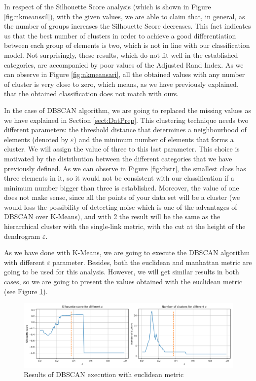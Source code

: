 In respect of the Silhouette Score analysis (which is shown in Figure \ref{fig:nkmeanssil}), with the given values, we are able to claim that, in general, as the number of groups increases the Silhouette Score decreases. This fact indicates us that the best number of clusters in order to achieve a good differentiation between each group of elements is two, which is not in line with our classification model. Not surprisingly, these results, which do not fit well in the established categories, are accompanied by poor values of the Adjusted Rand Index. As we can observe in Figure \ref{fig:nkmeansari}, all the obtained values with any number of cluster is very close to zero, which means, as we have previously explained, that the obtained classification does not match with ours.

In the case of DBSCAN algorithm, we are going to replaced the missing values as we have explained in Section \ref{sect:DatPrep}. This clustering technique needs two different parameters: the threshold distance that determines a neighbourhood of elements (denoted by $\varepsilon$) and the minimum number of elements that forms a cluster. We will assign the value of three to this last parameter. This choice is motivated by the distribution between the different categories that we have previously defined. As we can observe in Figure \ref{fig:distr}, the smallest class has three elements in it, so it would not be consistent with our classification if a minimum number bigger than three is established. Moreover, the value of one does not make sense, since all the points of your data set will be a cluster (we would loss the possibility of detecting noise which is one of the advantages of DBSCAN over K-Means), and with 2 the result will be the same as the hierarchical cluster \citep{nielsen2016hierarchical} with the single-link metric, with the cut at the height of the dendrogram $\varepsilon$.

As we have done with K-Means, we are going to execute the DBSCAN algorithm with different $\varepsilon$ parameter. Besides, both the euclidean and manhattan metric are going to be used for this analysis. However, we will get similar results in both cases, so we are going to present the values obtained with the euclidean metric (see Figure \ref{fig:dbscaneu}).

\begin{figure}[t]
	\centering%
	\centerline{\includegraphics[width=\textwidth]{Imagenes/Bitmap/Clustering/dbscansil.png}}%
	\caption{Results of DBSCAN execution with euclidean metric}%
	\label{fig:dbscaneu}
\end{figure}


